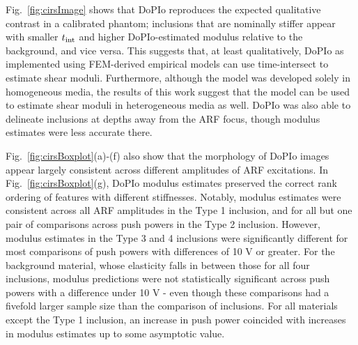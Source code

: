Fig.~\ref{fig:cirsImage} shows that DoPIo reproduces the expected qualitative contrast in a calibrated phantom; inclusions that are nominally stiffer appear with smaller $t_{\textnormal{int}}$ and higher DoPIo-estimated modulus relative to the background, and vice versa. This suggests that, at least qualitatively, DoPIo as implemented using FEM-derived empirical models can use time-intersect to estimate shear moduli. Furthermore, although the model was developed solely in homogeneous media, the results of this work suggest that the model can be used to estimate shear moduli in heterogeneous media as well. DoPIo was also able to delineate inclusions at depths away from the ARF focus, though modulus estimates were less accurate there. 

Fig.~\ref{fig:cirsBoxplot}(a)-(f) also show that the morphology of DoPIo images appear largely consistent across different amplitudes of ARF excitations. In Fig.~\ref{fig:cirsBoxplot}(g), DoPIo modulus estimates preserved the correct rank ordering of features with different stiffnesses. Notably, modulus estimates were consistent across all ARF amplitudes in the Type 1 inclusion, and for all but one pair of comparisons across push powers in the Type 2 inclusion. However, modulus estimates in the Type 3 and 4 inclusions were significantly different for most comparisons of push powers with differences of 10 V or greater. For the background material, whose elasticity falls in between those for all four inclusions, modulus predictions were not statistically significant across push powers with a difference under 10 V - even though these comparisons had a fivefold larger sample size than the comparison of inclusions. For all materials except the Type 1 inclusion, an increase in push power coincided with increases in modulus estimates up to some asymptotic value.

